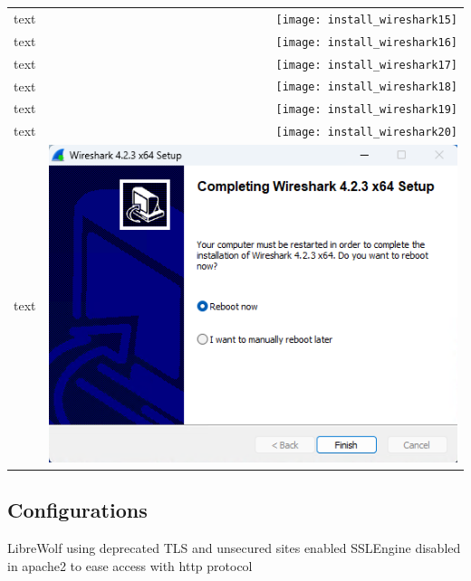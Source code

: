 \documentclass[11pt,a4paper]{report}
\begin{document}
\begin{tabular}{ l r }
            text & \texttt{[image: install\_wireshark15]} \\
            text & \texttt{[image: install\_wireshark16]} \\
            text & \texttt{[image: install\_wireshark17]} \\
            text & \texttt{[image: install\_wireshark18]} \\
            text & \texttt{[image: install\_wireshark19]} \\
            text & \texttt{[image: install\_wireshark20]} \\
            text & \includegraphics[scale=1.0]{install_wireshark21} \\
        \end{tabular}

    \subsection{Configurations}
        LibreWolf using deprecated TLS and unsecured sites enabled
        SSLEngine disabled in apache2 to ease access with http protocol
        
\end{document}
